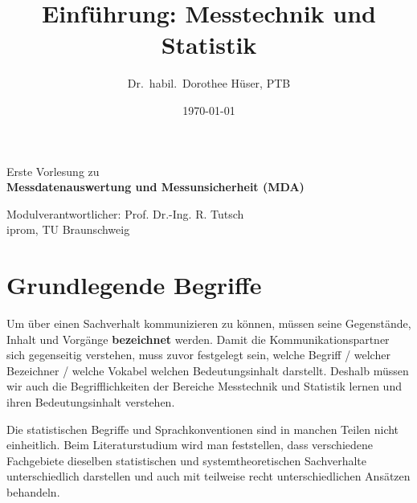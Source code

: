 \documentclass[a4paper,12pt,DIV=15]{scrartcl}
\title{Einführung: Messtechnik und Statistik}
\author{Dr.\ habil.\ Dorothee Hüser, PTB}
\date{\today}
\begin{document}
\maketitle

\begin{center}
\Large{Erste Vorlesung zu\\
\textbf{Messdatenauswertung und Messunsicherheit (MDA)}}

\large{Modulverantwortlicher: Prof. Dr.-Ing. R. Tutsch\\
iprom, TU Braunschweig}
\end{center}


\section{Grundlegende Begriffe}
Um über einen Sachverhalt kommunizieren zu können, müssen seine Gegenstände, Inhalt und Vorgänge
\textbf{bezeichnet} werden. Damit die Kommunikationspartner sich gegenseitig verstehen, muss zuvor
festgelegt sein, welche Begriff / welcher Bezeichner / welche Vokabel welchen Bedeutungsinhalt darstellt.
Deshalb müssen wir auch die Begrifflichkeiten der Bereiche Messtechnik und Statistik lernen und ihren
Bedeutungsinhalt verstehen.

Die statistischen Begriffe und Sprachkonventionen sind in manchen Teilen nicht einheitlich.
Beim Literaturstudium wird man feststellen, dass verschiedene Fachgebiete dieselben statistischen und
systemtheoretischen Sachverhalte unterschiedlich darstellen und auch mit teilweise recht unterschiedlichen
Ansätzen behandeln.
\end{document}
